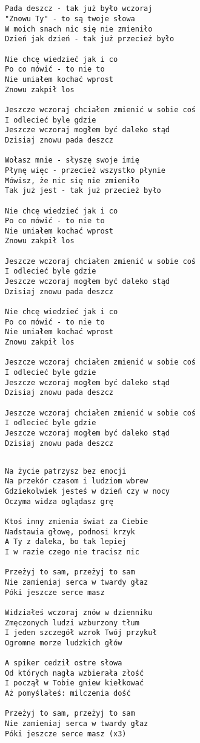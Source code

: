\documentclass[12pt]{article}
\begin{document}
\subsection*{}
\begin{verbatim}
Pada deszcz - tak już było wczoraj
"Znowu Ty" - to są twoje słowa
W moich snach nic się nie zmieniło
Dzień jak dzień - tak już przecież było

Nie chcę wiedzieć jak i co
Po co mówić - to nie to
Nie umiałem kochać wprost
Znowu zakpił los

Jeszcze wczoraj chciałem zmienić w sobie coś
I odlecieć byle gdzie
Jeszcze wczoraj mogłem być daleko stąd
Dzisiaj znowu pada deszcz

Wołasz mnie - słyszę swoje imię
Płynę więc - przecież wszystko płynie
Mówisz, że nic się nie zmieniło
Tak już jest - tak już przecież było

Nie chcę wiedzieć jak i co
Po co mówić - to nie to
Nie umiałem kochać wprost
Znowu zakpił los

Jeszcze wczoraj chciałem zmienić w sobie coś
I odlecieć byle gdzie
Jeszcze wczoraj mogłem być daleko stąd
Dzisiaj znowu pada deszcz

Nie chcę wiedzieć jak i co
Po co mówić - to nie to
Nie umiałem kochać wprost
Znowu zakpił los

Jeszcze wczoraj chciałem zmienić w sobie coś
I odlecieć byle gdzie
Jeszcze wczoraj mogłem być daleko stąd
Dzisiaj znowu pada deszcz

Jeszcze wczoraj chciałem zmienić w sobie coś
I odlecieć byle gdzie
Jeszcze wczoraj mogłem być daleko stąd
Dzisiaj znowu pada deszcz
\end{verbatim}
\clearpage

\subsection*{}
\begin{verbatim}
Na życie patrzysz bez emocji
Na przekór czasom i ludziom wbrew
Gdziekolwiek jesteś w dzień czy w nocy
Oczyma widza oglądasz grę

Ktoś inny zmienia świat za Ciebie
Nadstawia głowę, podnosi krzyk
A Ty z daleka, bo tak lepiej
I w razie czego nie tracisz nic

Przeżyj to sam, przeżyj to sam
Nie zamieniaj serca w twardy głaz
Póki jeszcze serce masz

Widziałeś wczoraj znów w dzienniku
Zmęczonych ludzi wzburzony tłum
I jeden szczegół wzrok Twój przykuł
Ogromne morze ludzkich głów

A spiker cedził ostre słowa
Od których nagła wzbierała złość
I począł w Tobie gniew kiełkować
Aż pomyślałeś: milczenia dość

Przeżyj to sam, przeżyj to sam
Nie zamieniaj serca w twardy głaz
Póki jeszcze serce masz (x3)
\end{verbatim}
\clearpage
\end{document}
